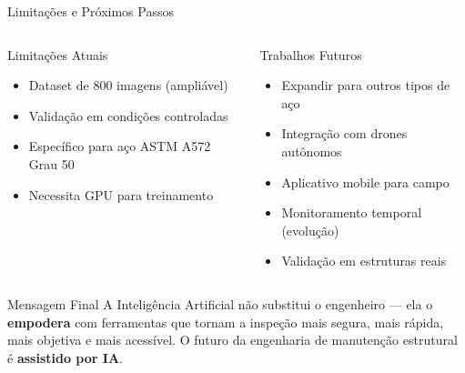 \documentclass[aspectratio=169, 12pt]{beamer}
\begin{document}
\begin{frame}{Limitações e Próximos Passos}
    \begin{columns}[T]
        \begin{alertblock}{Limitações Atuais}
            \begin{itemize}
                \item Dataset de 800 imagens (ampliável)
                \item Validação em condições controladas
                \item Específico para aço ASTM A572 Grau 50
                \item Necessita GPU para treinamento
            \end{itemize}
        \end{alertblock}

        \begin{exampleblock}{Trabalhos Futuros}
            \begin{itemize}
                \item Expandir para outros tipos de aço
                \item Integração com drones autônomos
                \item Aplicativo mobile para campo
                \item Monitoramento temporal (evolução)
                \item Validação em estruturas reais
            \end{itemize}
        \end{exampleblock}
    \end{columns}

    \vspace{0.5cm}

    \begin{block}{Mensagem Final}
        A Inteligência Artificial não substitui o engenheiro --- ela o \textbf{empodera} com ferramentas que tornam a inspeção mais segura, mais rápida, mais objetiva e mais acessível. O futuro da engenharia de manutenção estrutural é \textbf{assistido por IA}.
    \end{block}
\end{frame}
\end{document}
